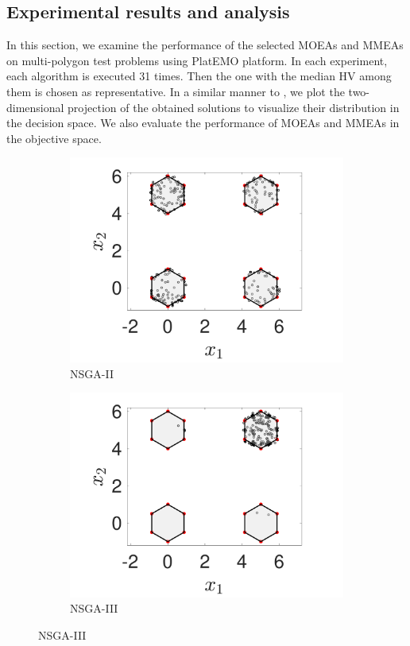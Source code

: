 \documentclass[conference]{IEEEtran}
\begin{document}
\subsection{Experimental results and analysis}
\label{Experimental Results}
In this section, we examine the performance of the selected MOEAs and MMEAs on multi-polygon test problems using PlatEMO platform\cite{tian2017platemo}. In each experiment, each algorithm is executed 31 times. Then the one with the median HV among them is chosen as representative. In a similar manner to \cite{ishibuchi2019salable}, we plot the two-dimensional projection of the obtained solutions to visualize their distribution in the decision space. We also evaluate the performance of MOEAs and MMEAs in the objective space.
\begin{figure}[t!]
    \centering
    \begin{subfigure}[b]{.24\textwidth}
    \includegraphics[width=\linewidth]{Section5/dim2/PS/NSGAII}
    \caption{NSGA-II}
    \end{subfigure}
    \begin{subfigure}[b]{.24\textwidth}
    \includegraphics[width=\linewidth]{Section5/dim2/PS/NSGAIII}
    \caption{NSGA-III}
    \end{subfigure}
    

\end{figure}
\end{document}
